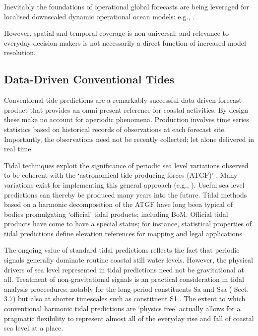 Inevitably the foundations of operational global forecasts are being leveraged for localised downscaled dynamic operational ocean models: e.g., \cite{Paramygin:2017dx,Yang:2016ep,Wei:2014ex,Peng:2014kq}.

However, spatial and temporal coverage is non universal; and relevance to everyday decision makers is not necessarily a direct function of increased model resolution.  


\subsection{Data-Driven Conventional Tides}
\label{sec:tide_intro}

Conventional tide predictions are a remarkably successful data-driven forecast product that provides an omni-present reference for coastal activities.
By design these make no account for aperiodic phenomena. 
Production involves time series statistics based on historical records of observations at each forecast site.
Importantly, the observations need not be recently collected; let alone delivered in real time.

Tidal techniques exploit the significance of periodic sea level variations observed to be coherent with the `astronomical tide producing forces (ATGF)' \cite{Hendershott:1981ub}.     
Many variations exist for implementing this general approach (e.g., \cite{Foreman:2009bg,Groves:1975ky,LEFFLER:2009ej,Smith:1997ut} ). 
Useful sea level predictions can thereby be produced many years into the future.  
Tidal methods based on a harmonic decomposition of the ATGF have long been typical of bodies promulgating `official' tidal products; including BoM.
Official tidal products have come to have a special status; for instance, statistical properties of tidal predictions define elevation references for mapping and legal applications \cite{Mapping:2014wu}

The ongoing value of standard tidal predictions reflects the fact that periodic signals generally dominate routine coastal still water levels.
However, the physical drivers of sea level represented in tidal predictions need not be gravitational at all.
Treatment of non-gravitational signals is an practical consideration in tidal analysis proceedures; notably for the long-period constituents Sa and Ssa (\cite[]{Parker:2007wq} Sect. 3.7) but also at shorter timescales such as constituent S1 \cite{Ray:2004ts}.
The extent to which conventional harmonic tidal predictions are `physics free' actually allows for a pragmatic flexibility to represent almost all of the everyday rise and fall of coastal sea level at a place.

